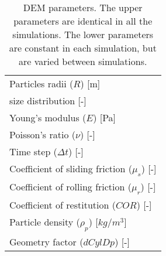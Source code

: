 \begin{table}[h]
\centering
\begin{tabular}{l}
\hline 
    Particles radii ($R$) [m]   \\ [5pt]

	size distribution [-] \\ [5pt]

    Young's modulus ($E$) [Pa] \\ [5pt]

    Poisson's ratio ($\nu$) [-] \\ 
     Time step ($\Delta t$) [-] \\ [5pt]
        \hline
     Coefficient of sliding friction ($\mu_s$) [-] \\  [5pt]
    Coefficient of rolling friction ($\mu_r$) [-] \\ [5pt]
    Coefficient of restitution ($COR$) [-] \\ [5pt]
     Particle density ($\rho_p$) [$kg/m^3$] \\ [5pt]
    Geometry factor ($dCylDp$) [-] \\ [5pt]
   


\hline
\end{tabular}
\caption[DEM parameters]{DEM parameters. The upper parameters are
identical in all the simulations. The lower parameters are constant in each
simulation, but are varied between simulations.}
\label{tab:08DEMparameters}
\end{table}

